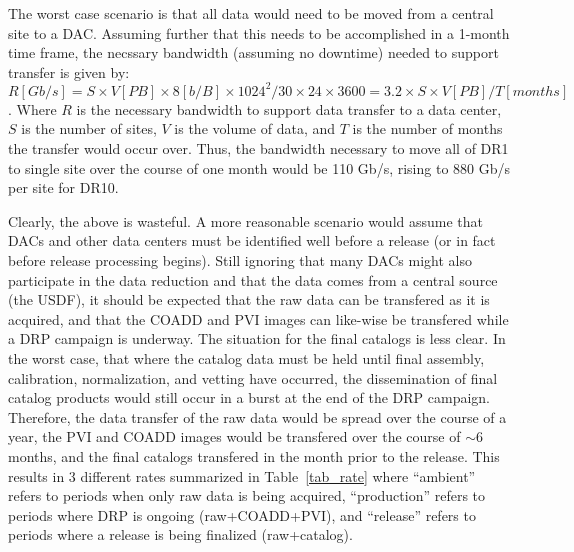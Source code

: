 The worst case scenario is that all data would need to be moved from a central site to a DAC.  
Assuming further that this needs to be accomplished in a 1-month time frame, the necssary bandwidth 
(assuming no downtime) needed to support transfer is given by: 
$$ R[Gb/s] = S \times V[PB] \times 8 [b/B] \times 1024^2 / 30 \times 24 \times 3600 = 3.2 \times S \times V[PB] / T[months] $$.
Where $R$ is the necessary bandwidth to support data transfer to a data center, $S$ is the number 
of sites, $V$ is the volume of data, and $T$ is the number of months the transfer would occur over.  
Thus, the bandwidth necessary to move all of DR1 to single site over the course of one month would
be 110 Gb/s, rising to 880 Gb/s per site for DR10.

Clearly, the above is wasteful.  A more reasonable scenario would assume that DACs and other 
data centers must be identified well before a release (or in fact before release processing begins).
Still ignoring that many DACs might also participate in the data reduction and that the data comes 
from a central source (the USDF), it should be expected that the raw data can be transfered as
it is acquired, and that the COADD and PVI images can like-wise be transfered while a DRP 
campaign is underway.  The situation for the final catalogs is less clear.  In the worst case, 
that where the catalog data must be held until final assembly, calibration, normalization, and 
vetting have occurred, the dissemination of final catalog products would still occur in a burst
at the end of the DRP campaign.  Therefore, the data transfer of the raw data would be spread 
over the course of a year, the PVI and COADD images would be transfered over the course of 
$\sim$6 months, and the final catalogs transfered in the month prior to the release.  This results 
in 3 different rates summarized in Table~\ref{tab_rate} where ``ambient'' refers to periods when 
only raw data is being acquired, ``production'' refers to periods where DRP is ongoing 
(raw+COADD+PVI), and ``release'' refers to periods where a release is being finalized 
(raw+catalog).


